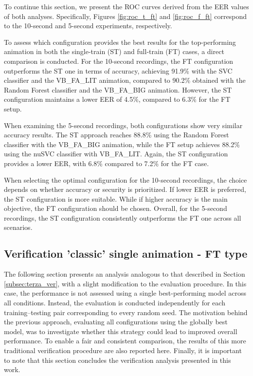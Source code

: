 \documentclass{article}
\begin{document}
To continue this section, we present the ROC curves derived from the EER values of both analyses. 
Specifically, Figures \ref{fig:roc_t_ft} and \ref{fig:roc_f_ft} correspond to the 10-second and 5-second experiments, respectively.

To assess which configuration provides the best results for the top-performing animation in both the single-train (ST) and full-train (FT) cases, a direct comparison is conducted.
For the 10-second recordings, the FT configuration outperforms the ST one in terms of accuracy, achieving 91.9\% with the SVC classifier and the VB\_FA\_LIT animation, compared to 90.2\% obtained with the Random Forest classifier and the VB\_FA\_BIG animation.
However, the ST configuration maintains a lower EER of 4.5\%, compared to 6.3\% for the FT setup.

When examining the 5-second recordings, both configurations show very similar accuracy results. 
The ST approach reaches 88.8\% using the Random Forest classifier with the VB\_FA\_BIG animation, while the FT setup achieves 88.2\% using the nuSVC classifier with VB\_FA\_LIT.
Again, the ST configuration provides a lower EER, with 6.8\% compared to 7.2\% for the FT case.

When selecting the optimal configuration for the 10-second recordings, the choice depends on whether accuracy or security is prioritized. 
If lower EER is preferred, the ST configuration is more suitable.
While if higher accuracy is the main objective, the FT configuration should be chosen.
Overall, for the 5-second recordings, the ST configuration consistently outperforms the FT one across all scenarios.
\FloatBarrier

\subsection{Verification ’classic’ single animation - FT type}

The following section presents an analysis analogous to that described in Section \ref{subsec:terza_ver}, with a slight modification to the evaluation procedure.
In this case, the performance is not assessed using a single best-performing model across all conditions. 
Instead, the evaluation is conducted independently for each training–testing pair corresponding to every random seed.
The motivation behind the previous approach, evaluating all configurations using the globally best model, was to investigate whether this strategy could lead to improved overall performance.
To enable a fair and consistent comparison, the results of this more traditional verification procedure are also reported here.
Finally, it is important to note that this section concludes the verification analysis presented in this work.
\end{document}
